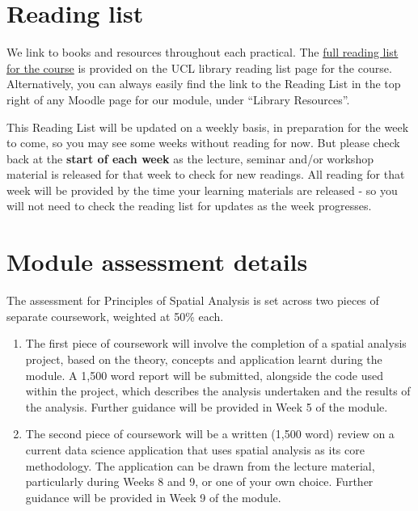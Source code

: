 \documentclass[
]{book}
\begin{document}
\hypertarget{reading-list}{%
\section*{Reading list}\label{reading-list}}

We link to books and resources throughout each practical. The \href{https://rl.talis.com/3/ucl/lists/3FB0C66A-F603-A402-A31C-28F2DA091AB6.html?lang=en-gb\&login=1}{full reading list for the course} is provided on the UCL library reading list page for the course. Alternatively, you can always easily find the link to the Reading List in the top right of any Moodle page for our module, under ``Library Resources''.

This Reading List will be updated on a weekly basis, in preparation for the week to come, so you may see some weeks without reading for now. But please check back at the \textbf{start of each week} as the lecture, seminar and/or workshop material is released for that week to check for new readings. All reading for that week will be provided by the time your learning materials are released - so you will not need to check the reading list for updates as the week progresses.

\hypertarget{module-assessment-details}{%
\section*{Module assessment details}\label{module-assessment-details}}

The assessment for Principles of Spatial Analysis is set across two pieces of separate coursework, weighted at 50\% each.

\begin{enumerate}
\def\labelenumi{\arabic{enumi})}
\item
  The first piece of coursework will involve the completion of a spatial analysis project, based on the theory, concepts and application learnt during the module. A 1,500 word report will be submitted, alongside the code used within the project, which describes the analysis undertaken and the results of the analysis. Further guidance will be provided in Week 5 of the module.
\item
  The second piece of coursework will be a written (1,500 word) review on a current data science application that uses spatial analysis as its core methodology. The application can be drawn from the lecture material, particularly during Weeks 8 and 9, or one of your own choice. Further guidance will be provided in Week 9 of the module.
\end{enumerate}
\end{document}
